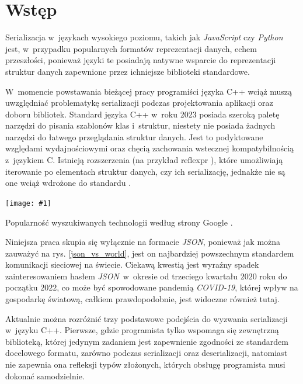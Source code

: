 \documentclass[12pt]{article}
\newcommand{\n}{\newline}
\newcommand{\putfig}[3]{
\begin{captioned}[H]
	\centering
	\texttt{[image: \#1]}
	\caption{#2}
	\label{#3}
	\medskip
\end{captioned}
}
\newcommand{\nonpl}[1]{{\it #1}}
\newcommand{\JSON}{\nonpl{JSON}}
\begin{document}
	{
		\tableofcontents
		\thispagestyle{fancy}
		\newpage
	}

	{
		\section{Wstęp}

		Serializacja w~językach wysokiego poziomu, takich jak \nonpl{JavaScript} czy \nonpl{Python} jest, w~przypadku popularnych formatów
		reprezentacji danych, echem przeszłości, ponieważ języki te posiadają natywne wsparcie do reprezentacji struktur danych
		zapewnione przez ichniejsze biblioteki standardowe.\n

		W~momencie powstawania bieżącej pracy programiści języka C++ wciąż muszą uwzględniać problematykę
		serializacji podczas projektowania aplikacji oraz doboru bibliotek. Standard języka C++ w~roku 2023 posiada szeroką
		paletę narzędzi do pisania szablonów klas i~struktur, niestety nie posiada żadnych narzędzi do łatwego przeglądania
		struktur danych. Jest to podyktowane względami wydajnościowymi oraz chęcią zachowania wstecznej
		kompatybilnością z~językiem C. Istnieją rozszerzenia (na przykład reflexpr \cite*{cpp_extension_reflexpr_iso}), które
		umożliwiają iterowanie po elementach struktur danych, czy ich serializację, jednakże nie są one wciąż wdrożone do
		standardu \cite*{cpp_extension_reflexpr_short}.\n

		\putfig{./charts/output_with_charts_as_images/json_vs_other_formats.png}{ Popularność wyszukiwanych technologii według strony Google \cite*{google_trends_json_api_vs_rest_of_the_world}.}{json_vs_world}

		Niniejsza praca skupia się wyłącznie na formacie \JSON\cite*{json_iso}, ponieważ jak można zauważyć na rys. \ref{json_vs_world}, jest on
		najbardziej powszechnym standardem komunikacji sieciowej na świecie. Ciekawą kwestią jest wyraźny spadek zainteresowaniem hasłem \JSON~w~okresie od
		trzeciego kwartału $2020$ roku do początku $2022$, co może być spowodowane pandemią \nonpl{COVID-19}, której wpływ na gospodarkę światową,
		całkiem prawdopodobnie, jest widoczne również tutaj.\n

		Aktualnie można rozróżnić trzy podstawowe podejścia do wyzwania serializacji w~języku C++. Pierwsze, gdzie programista tylko wspomaga się
		zewnętrzną biblioteką, której jedynym zadaniem jest zapewnienie zgodności ze standardem docelowego formatu, zarówno podczas serializacji
		oraz deserializacji, natomiast nie zapewnia ona refleksji typów złożonych, których obsługę programista musi dokonać samodzielnie.\n

}
\end{document}
